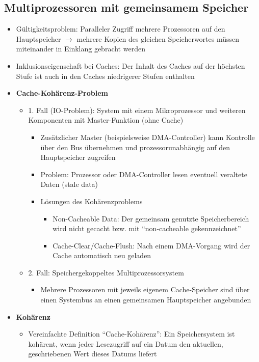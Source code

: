 \subsection{Multiprozessoren mit gemeinsamem Speicher}
\begin{itemize}
	\item Gültigkeitsproblem: Paralleler Zugriff mehrere Prozessoren auf den Hauptspeicher \(\rightarrow\) mehrere Kopien des gleichen Speicherwortes müssen miteinander in Einklang gebracht werden
	\item Inklusionseigenschaft bei Caches: Der Inhalt des Caches auf der höchsten Stufe ist auch in den Caches niedrigerer Stufen enthalten
	\item \textbf{Cache-Kohärenz-Problem}
	\begin{itemize}
		\item 1. Fall (IO-Problem): System mit einem Mikroprozessor und weiteren Komponenten mit Master-Funktion (ohne Cache)
		\begin{itemize}
			\item Zusätzlicher Master (beispielsweise DMA-Controller) kann Kontrolle über den Bus übernehmen und prozessorunabhängig auf den Hauptspeicher zugreifen
			\item Problem: Prozessor oder DMA-Controller lesen eventuell veraltete Daten (stale data)
			\item Lösungen des Kohärenzproblems
			\begin{itemize}
				\item Non-Cacheable Data: Der gemeinsam genutzte Speicherbereich wird nicht gecacht bzw. mit "`non-cacheable gekennzeichnet"'
				\item Cache-Clear/Cache-Flush: Nach einem DMA-Vorgang wird der Cache automatisch neu geladen
			\end{itemize}
		\end{itemize}
		\item 2. Fall: Speichergekoppeltes Multiprozessorsystem
		\begin{itemize}
			\item Mehrere Prozessoren mit jeweils eigenem Cache-Speicher sind über einen Systembus an einen gemeinsamen Hauptspeicher angebunden
		\end{itemize}
	\end{itemize}
	\item \textbf{Kohärenz}
	\begin{itemize}
		\item Vereinfachte Definition "`Cache-Kohärenz"': Ein Speichersystem ist kohärent, wenn jeder Lesezugriff auf ein Datum den aktuellen, geschriebenen Wert dieses Datums liefert

\end{itemize}
\end{itemize}
